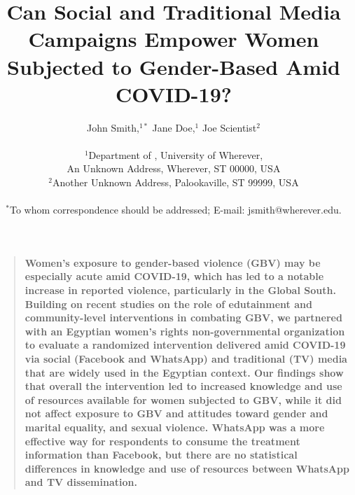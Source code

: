 \documentclass[12pt]{article}
\title{Can Social and Traditional Media Campaigns Empower Women Subjected to Gender-Based Amid COVID-19?}
\author
{John Smith,$^{1\ast}$ Jane Doe,$^{1}$ Joe Scientist$^{2}$\\
\\
\normalsize{$^{1}$Department of , University of Wherever,}\\
\normalsize{An Unknown Address, Wherever, ST 00000, USA}\\
\normalsize{$^{2}$Another Unknown Address, Palookaville, ST 99999, USA}\\
\\
\normalsize{$^\ast$To whom correspondence should be addressed; E-mail:  jsmith@wherever.edu.}
}
\date{}
\newenvironment{sciabstract}{%
\begin{quote} \bf}
{\end{quote}}
\begin{document}
 


\baselineskip24pt


\maketitle 




\begin{sciabstract}
Women's exposure to gender-based violence (GBV) may be especially acute amid COVID-19, which has led to a notable increase in reported violence, particularly in the  Global South. Building on recent studies on the role of edutainment and community-level interventions in combating GBV, we partnered with an Egyptian women’s rights non-governmental organization to evaluate a randomized intervention delivered amid COVID-19 via social (Facebook and WhatsApp) and traditional (TV) media that are widely used in the Egyptian context. Our findings show that overall the intervention led to increased knowledge and use of resources available for women subjected to GBV, while it did not affect exposure to GBV and attitudes toward gender and marital equality, and sexual violence. WhatsApp was a more effective way for respondents to consume the treatment information than Facebook, but there are no statistical differences in knowledge and use of resources between WhatsApp and TV dissemination.
\end{sciabstract}



\end{document}
